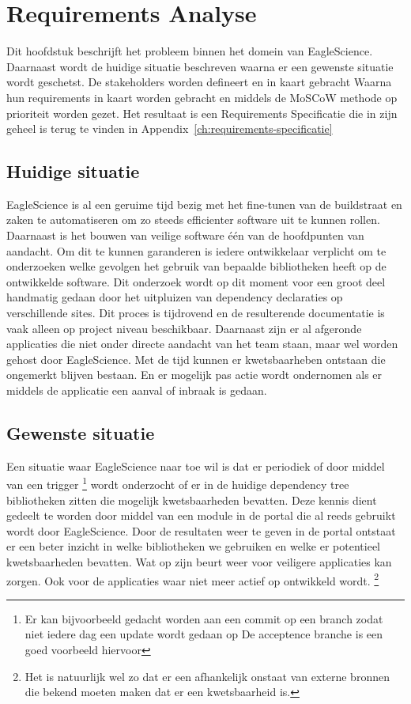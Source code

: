
\chapter{Requirements Analyse}\label{ch:requirements-analyse}

Dit hoofdstuk beschrijft het probleem binnen het domein van EagleScience. Daarnaast wordt de huidige situatie beschreven waarna er een gewenste situatie wordt geschetst. De stakeholders worden defineert en in kaart gebracht Waarna hun requirements in kaart worden gebracht en middels de MoSCoW methode op prioriteit worden gezet. Het resultaat is een Requirements Specificatie die in zijn geheel is terug te vinden in Appendix~\ref{ch:requirements-specificatie}

\section{Huidige situatie}\label{sec:huidige-situatie}
EagleScience is al een geruime tijd bezig met het fine-tunen van de buildstraat en zaken te automatiseren om zo steeds efficienter software uit te kunnen rollen. Daarnaast is het bouwen van veilige software één van de hoofdpunten van aandacht. Om dit te kunnen garanderen is iedere ontwikkelaar verplicht om te onderzoeken welke gevolgen het gebruik van bepaalde bibliotheken heeft op de ontwikkelde software. Dit onderzoek wordt op dit moment voor een groot deel handmatig gedaan door het uitpluizen van dependency declaraties op verschillende sites. Dit proces is tijdrovend en de resulterende documentatie is vaak alleen op project niveau beschikbaar. Daarnaast zijn er al afgeronde applicaties die niet onder directe aandacht van het team staan, maar wel worden gehost door EagleScience. Met de tijd kunnen er kwetsbaarheben ontstaan die ongemerkt blijven bestaan. En er mogelijk pas actie wordt ondernomen als er middels de applicatie een aanval of inbraak is gedaan.

\section{Gewenste situatie}\label{sec:gewenste-situatie}
Een situatie waar EagleScience naar toe wil is dat er periodiek of door middel van een trigger \footnote{Er kan bijvoorbeeld gedacht worden aan een commit op een branch zodat niet iedere dag een update wordt gedaan op De acceptence branche is een goed voorbeeld hiervoor} wordt onderzocht of er in de huidige dependency tree bibliotheken zitten die mogelijk kwetsbaarheden bevatten. Deze kennis dient gedeelt te worden door middel van een module in de portal die al reeds gebruikt wordt door EagleScience. Door de resultaten weer te geven in de portal ontstaat er een beter inzicht in welke bibliotheken we gebruiken en welke er potentieel kwetsbaarheden bevatten. Wat op zijn beurt weer voor veiligere applicaties kan zorgen. Ook voor de applicaties waar niet meer actief op ontwikkeld wordt. \footnote{Het is natuurlijk wel zo dat er een afhankelijk onstaat van externe bronnen die bekend moeten maken dat er een kwetsbaarheid is.}

